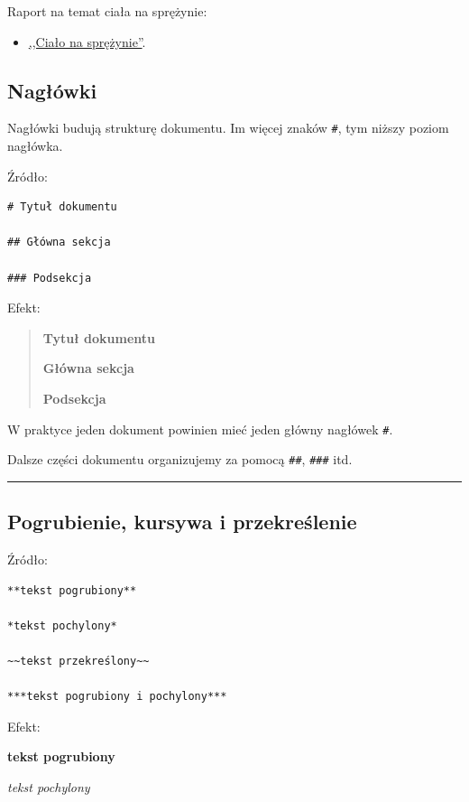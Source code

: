 \documentclass[11pt, a4paper]{article}
\begin{document}
Raport na temat ciała na sprężynie:

\begin{itemize}
    \item \href{examples/01_markdown/raport_cialo_na_sprezynie.md}{,,Ciało na sprężynie''}.
\end{itemize}

\subsection{Nagłówki}

Nagłówki budują strukturę dokumentu. Im więcej znaków \texttt{\#}, tym niższy poziom nagłówka.

Źródło:

\begin{verbatim}
# Tytuł dokumentu

## Główna sekcja

### Podsekcja
\end{verbatim}

Efekt:

\begin{quote}
{\LARGE \textbf{Tytuł dokumentu}}\par\medskip
{\Large \textbf{Główna sekcja}}\par\medskip
{\large \textbf{Podsekcja}}
\end{quote}

W praktyce jeden dokument powinien mieć jeden główny nagłówek \texttt{\#}.

Dalsze części dokumentu organizujemy za pomocą \texttt{\#\#}, \texttt{\#\#\#} itd.

\medskip\hrule\medskip

\subsection{Pogrubienie, kursywa i przekreślenie}

Źródło:

\begin{verbatim}
**tekst pogrubiony**

*tekst pochylony*

~~tekst przekreślony~~

***tekst pogrubiony i pochylony***
\end{verbatim}

Efekt:

\textbf{tekst pogrubiony}

\textit{tekst pochylony}
\end{document}
